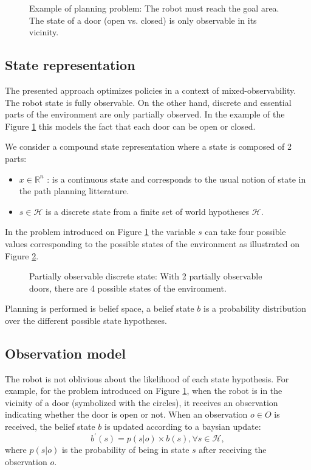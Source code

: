\documentclass[letterpaper, 10 pt, conference]{ieeeconf}  %
\begin{document}
\begin{figure}[!htb]
 \caption{Example of planning problem: The robot must reach the goal area. The state of a door (open vs. closed) is only observable in its vicinity. }
 \label{fig:problem}
\end{figure}

\subsection{State representation}
The presented approach optimizes policies in a context of mixed-observability. The robot state is fully observable. On the other hand, discrete and essential parts of the environment are only partially observed. In the example of the Figure \ref{fig:problem} this models the fact that each door can be open or closed.
 
We consider a compound state representation where a state is composed of 2 parts:
\begin{itemize}
\item $x \in \mathbb{R}^n$ : is a continuous state and corresponds to the usual notion of state in the path planning litterature.
\item $s \in \mathcal{H}$ is a discrete state from a finite set of world hypotheses $\mathcal{H}$.
\end{itemize}

In the problem introduced on Figure \ref{fig:problem} the variable $s$ can take four possible values corresponding to the possible states of the environment as illustrated on Figure \ref{fig:multiple_worlds}.

\begin{figure}[!htb]
 \caption{Partially observable discrete state: With 2 partially observable doors, there are 4 possible states of the environment.}
 \label{fig:multiple_worlds}
\end{figure}

Planning is performed is belief space, a belief state $b$ is a probability distribution over the different possible state hypotheses.

\subsection{Observation model}
\label{sec:observation_model}
The robot is not oblivious about the likelihood of each state hypothesis. For example, for the problem introduced on Figure \ref{fig:problem}, when the robot is in the vicinity of a door (symbolized with the circles), it receives an observation indicating whether the door is open or not. When an observation $o \in O$ is received, the belief state $b$ is updated according to a baysian update:
\begin{equation}
\label{eq:baysian}
b^\prime(s) = p(s | o) \times b(s), \forall s \in \mathcal{H},
\end{equation}
where $p(s | o)$ is the probability of being in state $s$ after receiving the observation $o$. 
\end{document}
